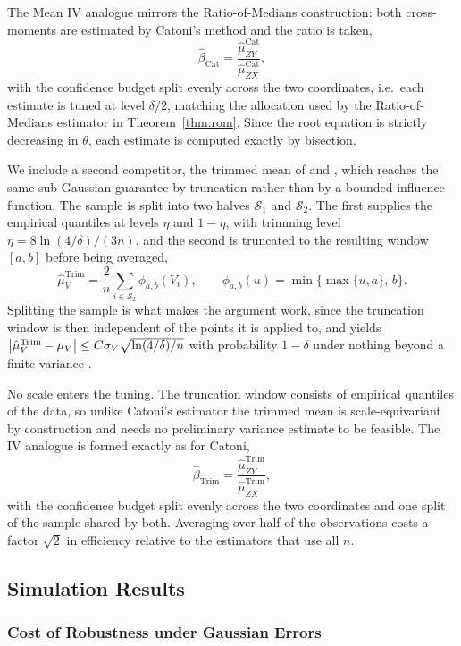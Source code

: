The Mean IV analogue mirrors the Ratio-of-Medians construction: both cross-moments are estimated by Catoni's method and the ratio is taken,
\[
    \hat{\beta}_{\mathrm{Cat}} = \frac{\hat{\mu}_{ZY}^{\mathrm{Cat}}}{\hat{\mu}_{ZX}^{\mathrm{Cat}}},
\]
with the confidence budget split evenly across the two coordinates, i.e.\ each estimate is tuned at level $\delta/2$, matching the allocation used by the Ratio-of-Medians estimator in Theorem~\ref{thm:rom}. Since the root equation is strictly decreasing in $\theta$, each estimate is computed exactly by bisection.

We include a second competitor, the trimmed mean of \citet{oliveira2019sub} and \citet{lugosi2021robust}, which reaches the same sub-Gaussian guarantee by truncation rather than by a bounded influence function. The sample is split into two halves $\mathcal{S}_1$ and $\mathcal{S}_2$. The first supplies the empirical quantiles at levels $\eta$ and $1-\eta$, with trimming level $\eta = 8\ln(4/\delta)/(3n)$, and the second is truncated to the resulting window $[a,b]$ before being averaged,
\[
    \hat{\mu}_V^{\mathrm{Trim}} = \frac{2}{n}\sum_{i \in \mathcal{S}_2} \phi_{a,b}(V_i),
    \qquad
    \phi_{a,b}(u) = \min\{\max\{u,a\},\,b\}.
\]
Splitting the sample is what makes the argument work, since the truncation window is then independent of the points it is applied to, and yields $\left|\hat{\mu}_V^{\mathrm{Trim}} - \mu_V\right| \leq C\sigma_V\sqrt{\ln(4/\delta)/n}$ with probability $1-\delta$ under nothing beyond a finite variance \citep{lugosi2021robust}.

No scale enters the tuning. The truncation window consists of empirical quantiles of the data, so unlike Catoni's estimator the trimmed mean is scale-equivariant by construction and needs no preliminary variance estimate to be feasible. The IV analogue is formed exactly as for Catoni,
\[
    \hat{\beta}_{\mathrm{Trim}} = \frac{\hat{\mu}_{ZY}^{\mathrm{Trim}}}{\hat{\mu}_{ZX}^{\mathrm{Trim}}},
\]
with the confidence budget split evenly across the two coordinates and one split of the sample shared by both. Averaging over half of the observations costs a factor $\sqrt{2}$ in efficiency relative to the estimators that use all $n$.

\subsection{Simulation Results}
\label{ss:simulation_results}

\subsubsection{Cost of Robustness under Gaussian Errors}
\label{sss:e1}

